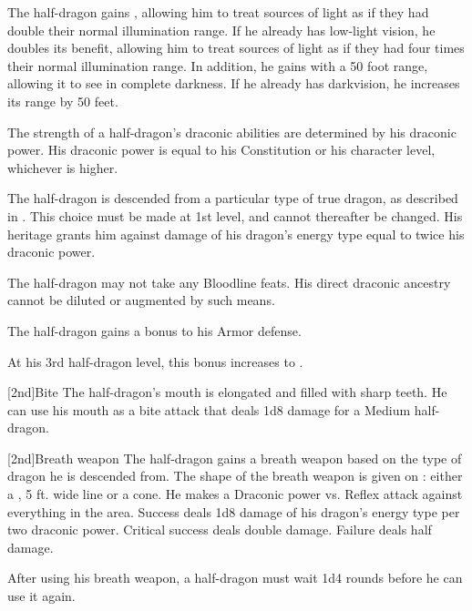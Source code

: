            The half-dragon gains , allowing him to treat sources of light as if they had double their normal illumination range.
            If he already has low-light vision, he doubles its benefit, allowing him to treat sources of light as if they had four times their normal illumination range.
            In addition, he gains  with a 50 foot range, allowing it to see in complete darkness.
            If he already has darkvision, he increases its range by 50 feet.

            The strength of a half-dragon's draconic abilities are determined by his draconic power.
            His draconic power is equal to his Constitution or his character level, whichever is higher.

             The half-dragon is descended from a particular type of true dragon, as described in . This choice must be made at 1st level, and cannot thereafter be changed.
            His heritage grants him  against damage of his dragon's energy type equal to twice his draconic power.

            The half-dragon may not take any Bloodline feats. His direct draconic ancestry cannot be diluted or augmented by such means.

             The half-dragon gains a  bonus to his Armor defense.

            At his 3rd half-dragon level, this bonus increases to .

            [2nd]{Bite} 
            The half-dragon's mouth is elongated and filled with sharp teeth.
            He can use his mouth as a bite attack that deals 1d8 damage for a Medium half-dragon.

            [2nd]{Breath weapon} The half-dragon gains a breath weapon based on the type of dragon he is descended from.
            The shape of the breath weapon is given on : either a \arealarge, 5 ft. wide line or a \areamed cone.
            He makes a Draconic power vs. Reflex attack against everything in the area.
            Success deals 1d8 damage of his dragon's energy type per two draconic power.
            Critical success deals double damage.
            Failure deals half damage.

            After using his breath weapon, a half-dragon must wait 1d4 rounds before he can use it again.

